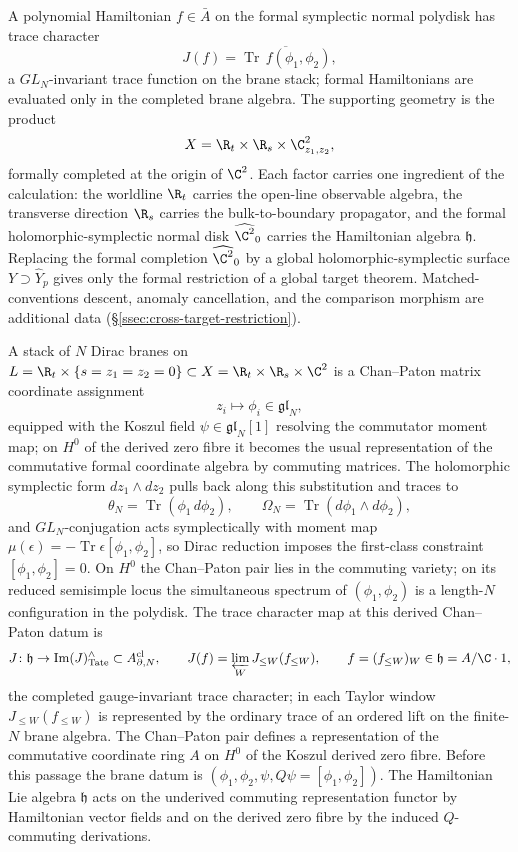 \documentclass[11pt]{memoir}
\begin{document}
A polynomial Hamiltonian \(f\in\bar A\) on the formal symplectic normal polydisk
has trace character
\[
  J(f)=\overline{\operatorname{Tr}\,f(\phi_1,\phi_2)},
\]
a \(GL_N\)-invariant trace function on the brane stack; formal
Hamiltonians are evaluated only in the completed brane algebra.  The supporting
geometry is the product
\[
  X=\R_t\times\R_s\times\C^2_{z_1,z_2},
\]
formally completed at the origin of \(\C^2\).  Each factor carries
one ingredient of the calculation: the worldline \(\R_t\) carries the
open-line observable algebra, the transverse direction \(\R_s\)
carries the bulk-to-boundary propagator, and the formal
holomorphic-symplectic normal disk \(\widehat{\C^2}_0\) carries the
Hamiltonian algebra $\mathfrak h$.  Replacing the formal completion
$\widehat{\C^2}_0$ by a global holomorphic-symplectic surface
$Y\supset\widehat{Y}_p$ gives only the formal restriction of a global
target theorem.  Matched-conventions descent, anomaly cancellation,
and the comparison morphism are additional data
(\S\ref{ssec:cross-target-restriction}).

A stack of \(N\) Dirac branes on
\(L=\R_t\times\{s=z_1=z_2=0\}\subset X=\R_t\times\R_s\times\C^2\)
is a Chan--Paton matrix coordinate assignment
\[
  z_i\longmapsto\phi_i\in\mathfrak{gl}_N,
\]
equipped with the Koszul field \(\psi\in\mathfrak{gl}_N[1]\) resolving
the commutator moment map; on \(H^0\) of the derived zero fibre it
becomes the usual representation of the commutative formal coordinate
algebra by commuting matrices.  The holomorphic symplectic form
\(dz_1\wedge dz_2\) pulls back along this substitution and traces to
\[
  \theta_N=\operatorname{Tr}(\phi_1\,d\phi_2),\qquad
  \Omega_N=\operatorname{Tr}(d\phi_1\wedge d\phi_2),
\]
and \(GL_N\)-conjugation acts symplectically with moment map
\(\mu(\epsilon)=-\operatorname{Tr}\epsilon[\phi_1,\phi_2]\), so Dirac
reduction imposes the first-class constraint
\([\phi_1,\phi_2]=0\).  On \(H^0\) the Chan--Paton pair lies in the
commuting variety; on its reduced semisimple locus the simultaneous
spectrum of \((\phi_1,\phi_2)\) is a length-\(N\) configuration in the
polydisk.  The trace character map at this derived Chan--Paton datum is
\[
	  J\colon\mathfrak h\to
	  \operatorname{Im}(J)^{\wedge}_{\mathrm{Tate}}
  \subset A^{\mathrm{cl}}_{\partial,N},
  \qquad
  J(f)=\varprojlim_W J_{\leq W}(f_{\leq W}),
  \qquad
  f=(f_{\leq W})_W\in\mathfrak h=A/\C\cdot 1,
\]
		the completed gauge-invariant trace character; in each Taylor window
		\(J_{\leq W}(f_{\leq W})\) is represented by the ordinary trace of an
		ordered lift on the finite-\(N\) brane algebra.
The Chan--Paton pair defines a representation of the commutative
coordinate ring \(A\) on \(H^0\) of the Koszul derived zero fibre.
Before this passage the
brane datum is
\((\phi_1,\phi_2,\psi,Q\psi=[\phi_1,\phi_2])\).  The Hamiltonian Lie
algebra \(\mathfrak h\) acts on the underived commuting representation
functor by Hamiltonian vector fields and on the derived zero fibre by
the induced \(Q\)-commuting derivations.
\end{document}
